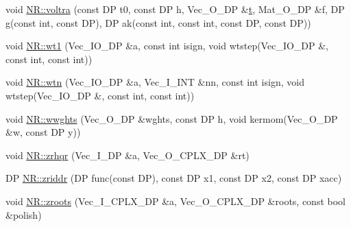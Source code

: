\begin{DoxyCompactItemize}
\item 
void \mbox{\hyperlink{namespaceNR_a7a4c7656e6a76336fb4d33e46f9c556c}{N\+R\+::voltra}} (const DP t0, const DP h, Vec\+\_\+\+O\+\_\+\+DP \&\mbox{\hyperlink{adat__devel_2lib_2hadron_2hadron__timeslice_8cc_ac310d9181e916ba43604099aee272c71}{t}}, Mat\+\_\+\+O\+\_\+\+DP \&f, DP g(const int, const DP), DP ak(const int, const int, const DP, const DP))
\item 
void \mbox{\hyperlink{namespaceNR_adf8819d18e13fefed2454ef15c091a5d}{N\+R\+::wt1}} (Vec\+\_\+\+I\+O\+\_\+\+DP \&a, const int isign, void wtstep(Vec\+\_\+\+I\+O\+\_\+\+DP \&, const int, const int))
\item 
void \mbox{\hyperlink{namespaceNR_a2eeb46a9d50e58e09b864b3b8f21ab5b}{N\+R\+::wtn}} (Vec\+\_\+\+I\+O\+\_\+\+DP \&a, Vec\+\_\+\+I\+\_\+\+I\+NT \&nn, const int isign, void wtstep(Vec\+\_\+\+I\+O\+\_\+\+DP \&, const int, const int))
\item 
void \mbox{\hyperlink{namespaceNR_a58e63db23848e90d1a5db7af79dda323}{N\+R\+::wwghts}} (Vec\+\_\+\+O\+\_\+\+DP \&wghts, const DP h, void kermom(Vec\+\_\+\+O\+\_\+\+DP \&w, const DP y))
\item 
void \mbox{\hyperlink{namespaceNR_a07f1329337e99d2666332950c702b2c7}{N\+R\+::zrhqr}} (Vec\+\_\+\+I\+\_\+\+DP \&a, Vec\+\_\+\+O\+\_\+\+C\+P\+L\+X\+\_\+\+DP \&rt)
\item 
DP \mbox{\hyperlink{namespaceNR_a13232764cfbf0d7a5acabe727c7109bd}{N\+R\+::zriddr}} (DP func(const DP), const DP x1, const DP x2, const DP xacc)
\item 
void \mbox{\hyperlink{namespaceNR_a7c019f6e455600b25e89123914373a23}{N\+R\+::zroots}} (Vec\+\_\+\+I\+\_\+\+C\+P\+L\+X\+\_\+\+DP \&a, Vec\+\_\+\+O\+\_\+\+C\+P\+L\+X\+\_\+\+DP \&roots, const bool \&polish)
\end{DoxyCompactItemize}
